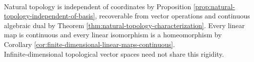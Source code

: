 \begin{perspective} \label{per:finite-dimensional-topology-is-rigid} \\
Natural topology is independent of coordinates by Proposition \ref{prop:natural-topology-independent-of-basis}, recoverable from vector operations and continuous algebraic dual by Theorem \ref{thm:natural-topology-characterization}. Every linear map is continuous and every linear isomorphism is a homeomorphism by Corollary \ref{cor:finite-dimensional-linear-maps-continuous}.\\
Infinite-dimensional topological vector spaces need not share this rigidity.
\end{perspective}
